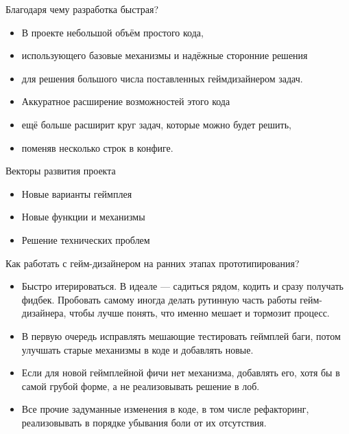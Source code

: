 \documentclass[aspectratio=169,handout,bigger]{beamer}
\begin{document}
\begin{frame}{Благодаря чему разработка быстрая?}
  \begin{itemize}
    \item В проекте небольшой объём простого кода,
    \item использующего базовые механизмы и надёжные сторонние решения
    \item для решения большого числа поставленных геймдизайнером задач.
  \end{itemize}

  \begin{itemize}
    \item Аккуратное расширение возможностей этого кода
    \item ещё больше расширит круг задач, которые можно будет решить,
    \item поменяв несколько строк в конфиге.
  \end{itemize}
\end{frame}


\begin{frame}{Векторы развития проекта}
  \begin{itemize}
    \item \Huge{Новые варианты геймплея}
    \item \large{Новые функции и механизмы}
    \item \normalsize{Решение технических проблем}
  \end{itemize}
\end{frame}


\begin{frame}{Как работать с гейм-дизайнером на ранних этапах прототипирования?}
  \begin{itemize}
    \item Быстро итерироваться.
          В идеале --- садиться рядом, кодить и сразу получать фидбек.
          Пробовать самому иногда делать рутинную часть работы гейм-дизайнера,
          чтобы лучше понять, что именно мешает и тормозит процесс.
    \item В первую очередь исправлять мешающие тестировать геймплей баги,
          потом улучшать старые механизмы в коде и добавлять новые.
    \item Если для новой геймплейной фичи нет механизма, добавлять его,
          хотя бы в самой грубой форме, а не реализовывать решение в лоб.
    \item Все прочие задуманные изменения в коде, в том числе рефакторинг,
          реализовывать в порядке убывания боли от их отсутствия.
  \end{itemize}
\end{frame}
\end{document}

